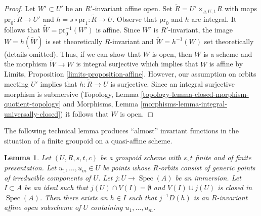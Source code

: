\documentclass{stacks-project}
\theoremstyle{plain}
\newtheorem{lemma}[subsection]{Lemma}
\theoremstyle{definition}
\theoremstyle{remark}
\numberwithin{equation}{subsection}
\def\Spec{\mathop{\mathrm{Spec}}}
\begin{document}
\begin{proof}
Let $W' \subset U'$ be an $R'$-invariant affine open.
Set $\tilde R = U' \times_{g, U, t} R$ with maps
$\text{pr}_0 : \tilde R \to U'$ and $h = s \circ \text{pr}_1 : \tilde R \to U$.
Observe that $\text{pr}_0$ and $h$ are integral.
It follows that $\tilde W = \text{pr}_0^{-1}(W')$ is affine.
Since $W'$ is $R'$-invariant, the image
$W = h(\tilde W)$ is set theoretically $R$-invariant and
$\tilde W = h^{-1}(W)$ set theoretically (details omitted).
Thus, if we can show that $W$ is open, then $W$ is a scheme
and the morphism $\tilde W \to W$ is integral surjective
which implies that $W$ is affine by
Limits, Proposition \ref{limits-proposition-affine}.
However, our assumption on orbits meeting $U'$ implies
that $h : \tilde R \to U$ is surjective. Since an
integral surjective morphism is submersive
(Topology, Lemma \ref{topology-lemma-closed-morphism-quotient-topology}
and Morphisms, Lemma \ref{morphisms-lemma-integral-universally-closed})
it follows that $W$ is open.
\end{proof}

\noindent
The following technical lemma produces ``almost'' invariant
functions in the situation of a finite groupoid on a quasi-affine
scheme.

\begin{lemma}
\label{lemma-find-almost-invariant-function}
Let $(U, R, s, t, c)$ be a groupoid scheme with $s, t$ finite and of
finite presentation. Let $u_1, \ldots, u_m \in U$ be points whose $R$-orbits
consist of generic points of irreducible components of $U$.
Let $j : U \to \Spec(A)$ be an immersion.
Let $I \subset A$ be an ideal such that $j(U) \cap V(I) = \emptyset$
and $V(I) \cup j(U)$ is closed in $\Spec(A)$.
Then there exists an $h \in I$ such that $j^{-1}D(h)$
is an $R$-invariant affine open subscheme of $U$ containing
$u_1, \ldots, u_m$.
\end{lemma}
\end{document}
